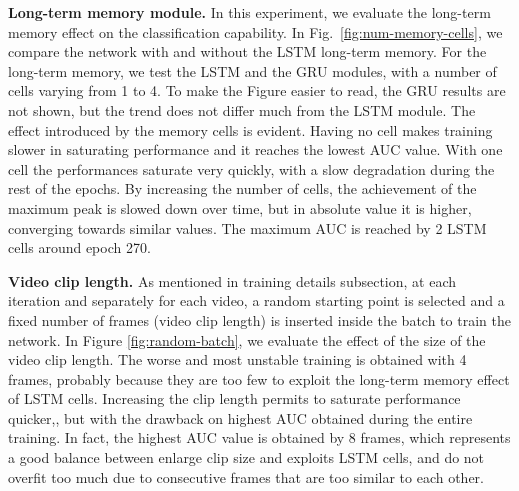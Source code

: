 
\noindent\textbf{Long-term memory module.}
In this experiment, we evaluate the long-term memory effect on the classification capability.
In Fig.~\ref{fig:num-memory-cells}, we compare the network with and without the LSTM long-term memory.
For the long-term memory, we test the LSTM and the GRU \cite{chung2014empirical} modules, with a number of cells varying from 1 to 4.
To make the Figure easier to read, the GRU results are not shown, but the trend does not differ much from the LSTM module. 
The effect introduced by the memory cells is evident.
Having no cell makes training slower in saturating performance and it reaches the lowest AUC value.
With one cell the performances saturate very quickly, with a slow degradation during the rest of the epochs.
By increasing the number of cells, the achievement of the maximum peak is slowed down over time, but in absolute value it is higher, converging towards similar values.
The maximum AUC is reached by 2 LSTM cells around epoch 270.


\noindent\textbf{Video clip length.}
As mentioned in training details subsection, at each iteration and separately for each video, a random starting point is selected and a fixed number of frames (video clip length) is inserted inside the batch to train the network.
In Figure \ref{fig:random-batch}, we evaluate the effect of the size of the video clip length.
The worse and most unstable training is obtained with 4 frames, probably because they are too few to exploit the long-term memory effect of LSTM cells.
Increasing the clip length permits to saturate performance quicker,, but with the drawback on highest AUC obtained during the entire training.
In fact, the highest AUC value is obtained by 8 frames, which represents a good balance between enlarge clip size and exploits LSTM cells, and do not overfit too much due to consecutive frames that are too similar to each other.

